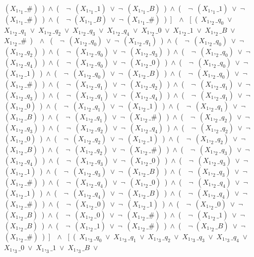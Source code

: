 ﻿\documentclass[a4paper,10pt]{article}
\begin{document}
$(X_1,_1\_\#)$\ )\ $\wedge$\ (\ \ $\neg$\ $(X_1,_1\_1)$\ $\vee$\ $\neg$\ $(X_1,_1\_B)$\ )\ $\wedge$\ (\ \ $\neg$\ $(X_1,_1\_1)$\ $\vee$\ $\neg$\ $(X_1,_1\_\#)$\ )\ $\wedge$\ (\ \ $\neg$ $(X_1,_1\_B)$\ $\vee$\ $\neg$ $(X_1,_1\_\#)$\ )\ ]\ \ $\wedge$ \ [\ (\ $X_1,_2\_q_0$\ $\vee$\ $X_1,_2\_q_1$\ $\vee$\ $X_1,_2\_q_2$\ $\vee$\ $X_1,_2\_q_3$\ $\vee$\ $X_1,_2\_q_4$\ $\vee$\ $X_1,_2\_0$\ $\vee$\ $X_1,_2\_1$\ $\vee$\ $X_1,_2\_B$\ $\vee$\ $X_1,_2\_\#$\ )\ \ $\wedge$ \ (\ \ $\neg$\ $(X_1,_2\_q_0)$\ $\vee$\ $\neg$\ $(X_1,_2\_q_1)$\ )\ $\wedge$\ (\ \ $\neg$\ $(X_1,_2\_q_0)$\ $\vee$\ $\neg$\ $(X_1,_2\_q_2)$\ )\ $\wedge$\ (\ \ $\neg$\ $(X_1,_2\_q_0)$\ $\vee$\ $\neg$\ $(X_1,_2\_q_3)$\ )\ $\wedge$\ (\ \ $\neg$\ $(X_1,_2\_q_0)$\ $\vee$\ $\neg$\ $(X_1,_2\_q_4)$\ )\ $\wedge$\ (\ \ $\neg$\ $(X_1,_2\_q_0)$\ $\vee$\ $\neg$\ $(X_1,_2\_0)$\ )\ $\wedge$\ (\ \ $\neg$\ $(X_1,_2\_q_0)$\ $\vee$\ $\neg$\ $(X_1,_2\_1)$\ )\ $\wedge$\ (\ \ $\neg$\ $(X_1,_2\_q_0)$\ $\vee$\ $\neg$\ $(X_1,_2\_B)$\ )\ $\wedge$\ (\ \ $\neg$\ $(X_1,_2\_q_0)$\ $\vee$\ $\neg$\ $(X_1,_2\_\#)$\ )\ $\wedge$\ (\ \ $\neg$\ $(X_1,_2\_q_1)$\ $\vee$\ $\neg$\ $(X_1,_2\_q_2)$\ )\ $\wedge$\ (\ \ $\neg$\ $(X_1,_2\_q_1)$\ $\vee$\ $\neg$\ $(X_1,_2\_q_3)$\ )\ $\wedge$\ (\ \ $\neg$\ $(X_1,_2\_q_1)$\ $\vee$\ $\neg$\ $(X_1,_2\_q_4)$\ )\ $\wedge$\ (\ \ $\neg$\ $(X_1,_2\_q_1)$\ $\vee$\ $\neg$\ $(X_1,_2\_0)$\ )\ $\wedge$\ (\ \ $\neg$\ $(X_1,_2\_q_1)$\ $\vee$\ $\neg$\ $(X_1,_2\_1)$\ )\ $\wedge$\ (\ \ $\neg$\ $(X_1,_2\_q_1)$\ $\vee$\ $\neg$\ $(X_1,_2\_B)$\ )\ $\wedge$\ (\ \ $\neg$\ $(X_1,_2\_q_1)$\ $\vee$\ $\neg$\ $(X_1,_2\_\#)$\ )\ $\wedge$\ (\ \ $\neg$\ $(X_1,_2\_q_2)$\ $\vee$\ $\neg$\ $(X_1,_2\_q_3)$\ )\ $\wedge$\ (\ \ $\neg$\ $(X_1,_2\_q_2)$\ $\vee$\ $\neg$\ $(X_1,_2\_q_4)$\ )\ $\wedge$\ (\ \ $\neg$\ $(X_1,_2\_q_2)$\ $\vee$\ $\neg$\ $(X_1,_2\_0)$\ )\ $\wedge$\ (\ \ $\neg$\ $(X_1,_2\_q_2)$\ $\vee$\ $\neg$\ $(X_1,_2\_1)$\ )\ $\wedge$\ (\ \ $\neg$\ $(X_1,_2\_q_2)$\ $\vee$\ $\neg$\ $(X_1,_2\_B)$\ )\ $\wedge$\ (\ \ $\neg$\ $(X_1,_2\_q_2)$\ $\vee$\ $\neg$\ $(X_1,_2\_\#)$\ )\ $\wedge$\ (\ \ $\neg$\ $(X_1,_2\_q_3)$\ $\vee$\ $\neg$\ $(X_1,_2\_q_4)$\ )\ $\wedge$\ (\ \ $\neg$\ $(X_1,_2\_q_3)$\ $\vee$\ $\neg$\ $(X_1,_2\_0)$\ )\ $\wedge$\ (\ \ $\neg$\ $(X_1,_2\_q_3)$\ $\vee$\ $\neg$\ $(X_1,_2\_1)$\ )\ $\wedge$\ (\ \ $\neg$\ $(X_1,_2\_q_3)$\ $\vee$\ $\neg$\ $(X_1,_2\_B)$\ )\ $\wedge$\ (\ \ $\neg$\ $(X_1,_2\_q_3)$\ $\vee$\ $\neg$\ $(X_1,_2\_\#)$\ )\ $\wedge$\ (\ \ $\neg$\ $(X_1,_2\_q_4)$\ $\vee$\ $\neg$\ $(X_1,_2\_0)$\ )\ $\wedge$\ (\ \ $\neg$\ $(X_1,_2\_q_4)$\ $\vee$\ $\neg$\ $(X_1,_2\_1)$\ )\ $\wedge$\ (\ \ $\neg$\ $(X_1,_2\_q_4)$\ $\vee$\ $\neg$\ $(X_1,_2\_B)$\ )\ $\wedge$\ (\ \ $\neg$\ $(X_1,_2\_q_4)$\ $\vee$\ $\neg$\ $(X_1,_2\_\#)$\ )\ $\wedge$\ (\ \ $\neg$\ $(X_1,_2\_0)$\ $\vee$\ $\neg$\ $(X_1,_2\_1)$\ )\ $\wedge$\ (\ \ $\neg$\ $(X_1,_2\_0)$\ $\vee$\ $\neg$\ $(X_1,_2\_B)$\ )\ $\wedge$\ (\ \ $\neg$\ $(X_1,_2\_0)$\ $\vee$\ $\neg$\ $(X_1,_2\_\#)$\ )\ $\wedge$\ (\ \ $\neg$\ $(X_1,_2\_1)$\ $\vee$\ $\neg$\ $(X_1,_2\_B)$\ )\ $\wedge$\ (\ \ $\neg$\ $(X_1,_2\_1)$\ $\vee$\ $\neg$\ $(X_1,_2\_\#)$\ )\ $\wedge$\ (\ \ $\neg$ $(X_1,_2\_B)$\ $\vee$\ $\neg$ $(X_1,_2\_\#)$\ )\ ]\ \ $\wedge$ \ [\ (\ $X_1,_3\_q_0$\ $\vee$\ $X_1,_3\_q_1$\ $\vee$\ $X_1,_3\_q_2$\ $\vee$\ $X_1,_3\_q_3$\ $\vee$\ $X_1,_3\_q_4$\ $\vee$\ $X_1,_3\_0$\ $\vee$\ $X_1,_3\_1$\ $\vee$\ $X_1,_3\_B$\ $\vee$\ 
\end{document}
